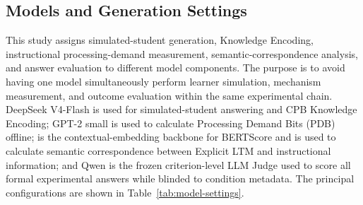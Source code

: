 \subsection{Models and Generation Settings}
\label{subsec:models-settings}

This study assigns simulated-student generation, Knowledge Encoding, instructional processing-demand measurement, semantic-correspondence analysis, and answer evaluation to different model components. The purpose is to avoid having one model simultaneously perform learner simulation, mechanism measurement, and outcome evaluation within the same experimental chain. DeepSeek V4-Flash is used for simulated-student answering and CPB Knowledge Encoding; GPT-2 small is used to calculate Processing Demand Bits (PDB) offline;  is the contextual-embedding backbone for BERTScore and is used to calculate semantic correspondence between Explicit LTM and instructional information; and Qwen is the frozen criterion-level LLM Judge used to score all formal experimental answers while blinded to condition metadata. The principal configurations are shown in Table~\ref{tab:model-settings}.


